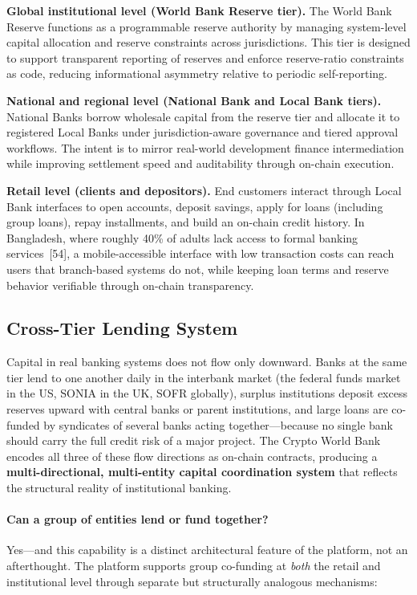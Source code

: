\documentclass[12pt,a4paper]{report}
\begin{document}
\textbf{Global institutional level (World Bank Reserve tier).} The World Bank Reserve functions as a programmable reserve authority by managing system-level capital allocation and reserve constraints across jurisdictions. This tier is designed to support transparent reporting of reserves and enforce reserve-ratio constraints as code, reducing informational asymmetry relative to periodic self-reporting.

\textbf{National and regional level (National Bank and Local Bank tiers).} National Banks borrow wholesale capital from the reserve tier and allocate it to registered Local Banks under jurisdiction-aware governance and tiered approval workflows. The intent is to mirror real-world development finance intermediation while improving settlement speed and auditability through on-chain execution.

\textbf{Retail level (clients and depositors).} End customers interact through Local Bank interfaces to open accounts, deposit savings, apply for loans (including group loans), repay installments, and build an on-chain credit history. In Bangladesh, where roughly 40\% of adults lack access to formal banking services~[54], a mobile-accessible interface with low transaction costs can reach users that branch-based systems do not, while keeping loan terms and reserve behavior verifiable through on-chain transparency.

\subsection{Cross-Tier Lending System}

Capital in real banking systems does not flow only downward. Banks at the same tier lend to one another daily in the interbank market (the federal funds market in the US, SONIA in the UK, SOFR globally), surplus institutions deposit excess reserves upward with central banks or parent institutions, and large loans are co-funded by syndicates of several banks acting together---because no single bank should carry the full credit risk of a major project. The Crypto World Bank encodes all three of these flow directions as on-chain contracts, producing a \textbf{multi-directional, multi-entity capital coordination system} that reflects the structural reality of institutional banking.

\paragraph{Can a group of entities lend or fund together?}\label{par:group-entities}
Yes---and this capability is a distinct architectural feature of the platform, not an afterthought. The platform supports group co-funding at \textit{both} the retail and institutional level through separate but structurally analogous mechanisms:
\end{document}
